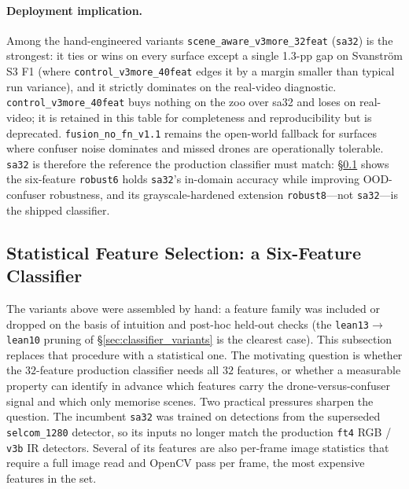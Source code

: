 \documentclass[12pt,a4paper,oneside,openright]{book}
\begin{document}
\paragraph{Deployment implication.}
Among the hand-engineered variants \texttt{scene\_aware\_v3more\_32feat} (\texttt{sa32}) is the strongest: it ties or wins on every surface except a single 1.3-pp gap on Svanstr\"om S3 F1 (where \texttt{control\_v3more\_40feat} edges it by a margin smaller than typical run variance), and it strictly dominates on the real-video diagnostic. \texttt{control\_v3more\_40feat} buys nothing on the zoo over sa32 and loses on real-video; it is retained in this table for completeness and reproducibility but is deprecated. \texttt{fusion\_no\_fn\_v1.1} remains the open-world fallback for surfaces where confuser noise dominates and missed drones are operationally tolerable. \texttt{sa32} is therefore the reference the production classifier must match: \S\ref{sec:feature_selection} shows the six-feature \texttt{robust6} holds \texttt{sa32}'s in-domain accuracy while improving OOD-confuser robustness, and its grayscale-hardened extension \texttt{robust8}---not \texttt{sa32}---is the shipped classifier.

\subsection{Statistical Feature Selection: a Six-Feature Classifier}
\label{sec:feature_selection}

The variants above were assembled by hand: a feature family was included or dropped on the basis of intuition and post-hoc held-out checks (the \texttt{lean13}$\to$\texttt{lean10} pruning of \S\ref{sec:classifier_variants} is the clearest case). This subsection replaces that procedure with a statistical one. The motivating question is whether the $32$-feature production classifier needs all $32$ features, or whether a measurable property can identify in advance which features carry the drone-versus-confuser signal and which only memorise scenes. Two practical pressures sharpen the question. The incumbent \texttt{sa32} was trained on detections from the superseded \texttt{selcom\_1280} detector, so its inputs no longer match the production \texttt{ft4} RGB / \texttt{v3b} IR detectors. Several of its features are also per-frame image statistics that require a full image read and OpenCV pass per frame, the most expensive features in the set.
\end{document}
